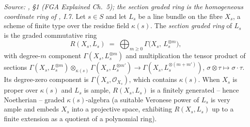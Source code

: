\begin{definition}
  \label{def:sectionGradedRing}
  \textit{Source: \cite{nitsure-hilbert-quot}, \S 1 (FGA Explained Ch.~5); the section graded
  ring is the homogeneous coordinate ring of \cite{hartshorne-ag}, I.7.}
  Let \(s \in S\) and let \(L_s\) be a line bundle on the fibre \(X_s\), a scheme
  of finite type over the residue field \(\kappa(s)\). The \emph{section graded
  ring} of \(L_s\) is the graded commutative ring
  \[
    R(X_s, L_s) \;=\; \bigoplus_{m \ge 0} \Gamma\bigl(X_s,\, L_s^{\otimes m}\bigr),
  \]
  with degree-\(m\) component \(\Gamma(X_s, L_s^{\otimes m})\) and multiplication
  the tensor product of sections
  \(\Gamma(X_s, L_s^{\otimes m}) \otimes_{\kappa(s)}
  \Gamma(X_s, L_s^{\otimes m'}) \to \Gamma(X_s, L_s^{\otimes (m+m')})\),
  \(\sigma \otimes \tau \mapsto \sigma \cdot \tau\). Its degree-zero component is
  \(\Gamma(X_s, \mathcal{O}_{X_s})\), which contains \(\kappa(s)\). When \(X_s\) is
  proper over \(\kappa(s)\) and \(L_s\) is ample, \(R(X_s, L_s)\) is a finitely
  generated -- hence Noetherian -- graded \(\kappa(s)\)-algebra (a suitable
  Veronese power of \(L_s\) is very ample and embeds \(X_s\) into a projective
  space, exhibiting \(R(X_s, L_s)\) up to a finite extension as a quotient of a
  polynomial ring).
\end{definition}

